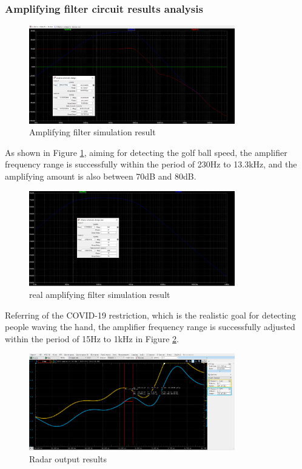 \subsubsection{Amplifying filter circuit results analysis}
\begin{figure}[H]
    \centering
    \includegraphics[width=0.8\textwidth]{figure/Amplifyingfiltersimulation result.png}
    \caption{Amplifying filter simulation result}
     \label{fig:amplifying}
\end{figure}
As shown in Figure \ref{fig:amplifying}, aiming for detecting the golf ball speed, the amplifier frequency range is successfully within the period of 230Hz to 13.3kHz, and the amplifying amount is also between 70dB and 80dB.
\begin{figure}[H]
    \centering
    \includegraphics[width=0.8\textwidth]{figure/realamplifyingfiltersimulationresult.png}
    \caption{real amplifying filter simulation result}
     \label{fig:amplifying_real}
\end{figure}
Referring of the COVID-19 restriction, which is the realistic goal for detecting people waving the hand, the amplifier frequency range is successfully adjusted within the period of 15Hz to 1kHz in Figure \ref{fig:amplifying_real}. 
\begin{figure}[H]
    \centering
    \includegraphics[width=0.8\textwidth]{figure/radar output results1.png}
    \caption{Radar output results}
     \label{fig:radar_output}
\end{figure}
